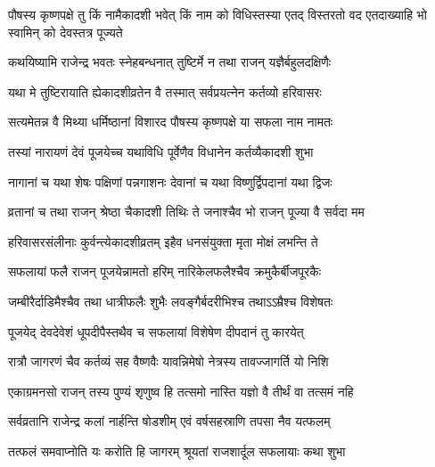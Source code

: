 \label{sec:padma-pausha-krishna-saphala}

\ganapatyadiDhyanam
\padmaPuranam



\threelineshloka
{पौषस्य  कृष्णपक्षे तु किं नामैकादशी भवेत्}
{किं नाम को विधिस्तस्या एतद् विस्तरतो वद}
{एतदाख्याहि भो स्वामिन् को देवस्तत्र पूज्यते}%


\twolineshloka
{कथयिष्यामि राजेन्द्र भवतः स्नेहबन्धनात्}
{तुष्टिर्मे न तथा राजन् यज्ञैर्बहुलदक्षिणैः}%

\twolineshloka
{यथा मे तुष्टिरायाति ह्येकादशीव्रतेन वै}
{तस्मात् सर्वप्रयत्नेन कर्तव्यो हरिवासरः}%

\twolineshloka
{सत्यमेतन्न वै मिथ्या धर्मिष्ठानां विशारद}
{पौषस्य कृष्णपक्षे या सफला नाम नामतः}%

\twolineshloka
{तस्यां नारायणं देवं पूजयेच्च यथाविधि}
{पूर्वेणैव विधानेन कर्तव्यैकादशी शुभा}%

\twolineshloka
{नागानां च यथा शेषः पक्षिणां पन्नगाशनः}
{देवानां च यथा विष्णुर्द्विपदानां यथा द्विजः}%

\twolineshloka
{व्रतानां च तथा राजन् श्रेष्ठा चैकादशी तिथिः}
{ते जनाश्चैव भो राजन् पूज्या वै सर्वदा मम}%

\twolineshloka
{हरिवासरसंलीनाः कुर्वन्त्येकादशीव्रतम्}
{इहैव धनसंयुक्ता मृता मोक्षं लभन्ति ते}%

\twolineshloka
{सफलायां फलै राजन् पूजयेन्नामतो हरिम्}
{नारिकेलफलैश्चैव क्रमुकैर्बीजपूरकैः}%

\twolineshloka
{जम्बीरैर्दाडिमैश्चैव तथा धात्रीफलैः शुभैः}
{लवङ्गैर्बदरीभिश्च तथाऽऽम्रैश्च विशेषतः}%

\twolineshloka
{पूजयेद् देवदेवेशं धूपदीपैस्तथैव च}
{सफलायां विशेषेण दीपदानं तु कारयेत्}%

\twolineshloka
{रात्रौ जागरणं चैव कर्तव्यं सह वैष्णवैः}
{यावन्निमेषो नेत्रस्य तावज्जागर्ति यो निशि}%

\twolineshloka
{एकाग्रमनसो राजन् तस्य पुण्यं शृणुष्व हि}
{तत्समो नास्ति यज्ञो वै तीर्थं वा तत्समं नहि}%

\twolineshloka
{सर्वव्रतानि राजेन्द्र कलां नार्हन्ति षोडशीम्}
{एवं वर्षसहस्राणि तपसा नैव यत्फलम्}%

\twolineshloka
{तत्फलं समवाप्नोति यः करोति हि जागरम्}
{श्रूयतां राजशार्दूल सफलायाः कथा शुभा}%

